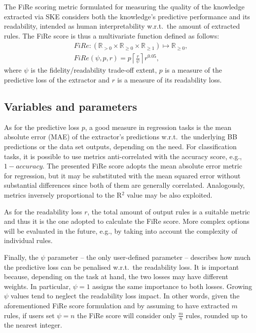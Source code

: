\documentclass{article}
\newcommand{\fire}{FiRe}
\begin{document}
The \fire{} scoring metric formulated for measuring the quality of the knowledge extracted via SKE considers both the knowledge's predictive performance and its readability, intended as human interpretability w.r.t.\ the amount of extracted rules.
%
The \fire{} score is thus a multivariate function defined as follows:
%
\begin{align}
	&\fire: \left( \mathbb{R}_{>0} \times \mathbb{R}_{\geq 0} \times \mathbb{R}_{\geq1} \right) \mapsto \mathbb{R}_{\geq 0},\\
	&\fire(\psi, p, r) = p \left \lceil{\frac{r}{\psi}}\right \rceil r^{0.05},
\end{align}
%
where $\psi$ is the fidelity/readability trade-off extent, $p$ is a measure of the predictive loss of the extractor and $r$ is a measure of its readability loss.

\subsection{Variables and parameters}\label{sec:fire-var}
As for the predictive loss $p$, a good measure in regression tasks is the mean absolute error (MAE) of the extractor's predictions w.r.t.\ the underlying BB predictions or the data set outputs, depending on the need.
%
For classification tasks, it is possible to use metrics anti-correlated with the accuracy score, e.g., $1-accuracy$.
%
The presented \fire{} score adopts the mean absolute error metric for regression, but it may be substituted with the mean squared error without substantial differences since both of them are generally correlated.
%
Analogously, metrics inversely proportional to the R$^2$ value may be also exploited.

As for the readability loss $r$, the total amount of output rules is a suitable metric and thus it is the one adopted to calculate the \fire{} score.
%
More complex options will be evaluated in the future, e.g., by taking into account the complexity of individual rules.

Finally, the $\psi$ parameter -- the only user-defined parameter -- describes how much the predictive loss can be penalised w.r.t.\ the readability loss.
%
It is important because, depending on the task at hand, the two losses may have different weights.
%
In particular, $\psi=1$ assigns the same importance to both losses.
%
Growing $\psi$ values tend to neglect the readability loss impact.
%
In other words, given the aforementioned \fire{} score formulation and by assuming to have extracted $m$ rules, if users set $\psi=n$ the \fire{} score will consider only $\frac{m}{n}$ rules, rounded up to the nearest integer.
\end{document}
